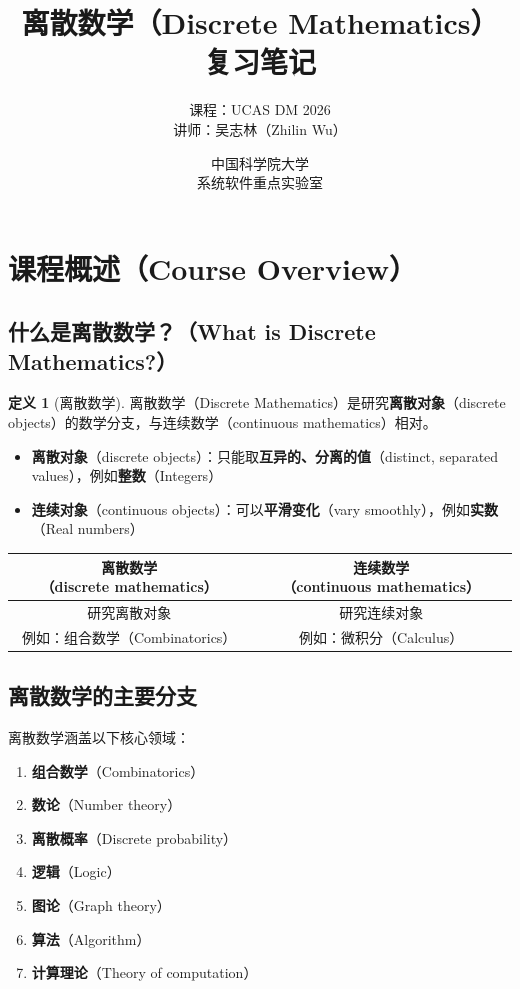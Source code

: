\documentclass[UTF8,11pt,a4paper]{ctexbook}   %
\title{\textbf{离散数学（Discrete Mathematics）复习笔记}}
\author{课程：UCAS DM 2026 \\ 讲师：吴志林（Zhilin Wu）}
\date{中国科学院大学 \\ 系统软件重点实验室}
\theoremstyle{definition}
\newtheorem{definition}{定义}[section]
\begin{document}
\sloppy
\maketitle
\tableofcontents
\newpage

\section{课程概述（Course Overview）}

\subsection{什么是离散数学？（What is Discrete Mathematics?）}

\begin{definition}[离散数学]
离散数学（Discrete Mathematics）是研究\textbf{离散对象}（discrete objects）的数学分支，与连续数学（continuous mathematics）相对。
\end{definition}

\begin{itemize}[leftmargin=2em]
    \item \textbf{离散对象}（discrete objects）：只能取\textbf{互异的、分离的值}（distinct, separated values），例如\textbf{整数}（Integers）
    \item \textbf{连续对象}（continuous objects）：可以\textbf{平滑变化}（vary smoothly），例如\textbf{实数}（Real numbers）
\end{itemize}

\begin{table}[htbp]
\centering
\begin{tabular}{|c|c|}
\hline
\textbf{离散数学}（discrete mathematics） & \textbf{连续数学}（continuous mathematics） \\
\hline
研究离散对象 & 研究连续对象 \\
例如：组合数学（Combinatorics） & 例如：微积分（Calculus） \\
\hline
\end{tabular}
\end{table}

\subsection{离散数学的主要分支}

离散数学涵盖以下核心领域：

\begin{enumerate}[leftmargin=2em]
    \item \textbf{组合数学}（Combinatorics）
    \item \textbf{数论}（Number theory）
    \item \textbf{离散概率}（Discrete probability）
    \item \textbf{逻辑}（Logic）
    \item \textbf{图论}（Graph theory）
    \item \textbf{算法}（Algorithm）
    \item \textbf{计算理论}（Theory of computation）
\end{enumerate}
\end{document}
